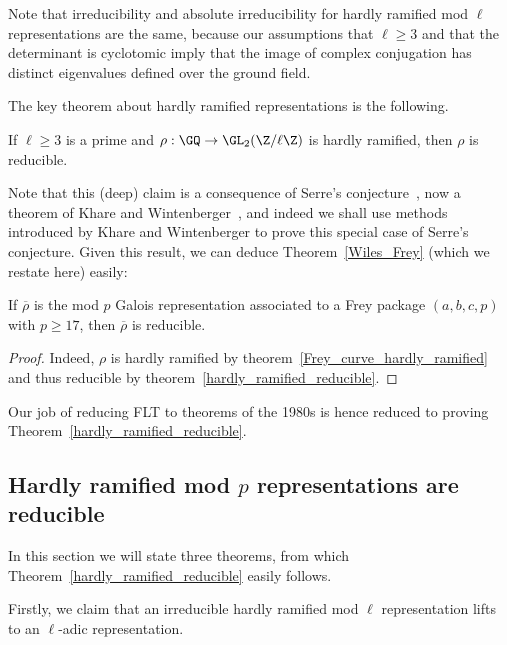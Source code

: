 Note that irreducibility and absolute irreducibility for hardly ramified mod $\ell$ representations
are the same, because our assumptions that $\ell\geq3$
and that the determinant is cyclotomic imply that the image of complex conjugation
has distinct eigenvalues defined over the ground field.

The key theorem about hardly ramified representations is the following.

\begin{theorem}
  \label{hardly_ramified_reducible}
  \leanok
  If $\ell\geq 3$ is a prime and $\rho:\GQ\to\GL_2(\Z/\ell\Z)$ is hardly ramified,
  then $\rho$ is reducible.
\end{theorem}

Note that this (deep) claim is a consequence of Serre's conjecture~\cite{serreconj},
now a theorem of Khare and Wintenberger~\cite{kwII}, and indeed we shall use
methods introduced by Khare and Wintenberger to prove this special case of
Serre's conjecture. Given this result, we can deduce Theorem~\ref{Wiles_Frey}
(which we restate here) easily:

\begin{theorem}
  \label{Wiles_Frey_again}
  \leanok
  If $\overline{\rho}$ is the mod $p$ Galois representation associated to a Frey package
  $(a,b,c,p)$ with $p\geq17$, then
  $\overline{\rho}$ is reducible.
\end{theorem}
\begin{proof}
  Indeed, $\rho$ is hardly ramified by theorem~\ref{Frey_curve_hardly_ramified}
  and thus reducible by theorem~\ref{hardly_ramified_reducible}.
\end{proof}

Our job of reducing FLT to theorems of the 1980s is hence reduced to proving
Theorem~\ref{hardly_ramified_reducible}.

\subsection{Hardly ramified mod $p$ representations are reducible}

In this section we will state three theorems, from which Theorem~\ref{hardly_ramified_reducible}
easily follows.

Firstly, we claim that
an irreducible hardly ramified mod $\ell$ representation lifts to an $\ell$-adic representation.

